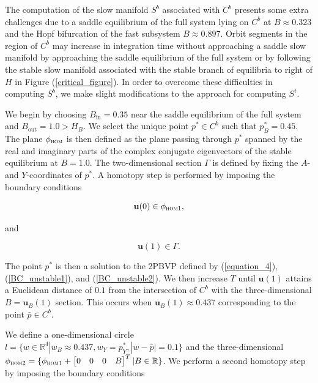 \documentclass{ws-ijbc}
\begin{document}
The computation of the slow manifold $S^b$ associated with $C^b$ presents some extra challenges due to a saddle equilibrium of the full system lying on $C^b$ at $B \approx 0.323$ and the Hopf bifurcation of the fast subsystem $B \approx 0.897$.  Orbit segments in the region of $C^b$ may increase in integration time without approaching a saddle slow manifold by approaching the saddle equilibrium of the full system or by following the stable slow manifold associated with the stable branch of equilibria to right of $H$ in Figure (\ref{critical_figure}).  In order to overcome these difficulties in computing $S^b$, we make slight modifications to the approach for computing $S^t$.

We begin by choosing $B_{\mathrm{in}} = 0.35$ near the saddle equilibrium of the full system and $B_{\mathrm{out}}=1.0 > H_B$.  We select the unique point $p^* \in C^b$ such that $p^*_B = 0.45$.  The plane $\phi_{\textsc{hom}}$ is then defined as the plane passing through $p^*$ spanned by the real and imaginary parts of the complex conjugate eigenvectors of the stable equilibrium at $B=1.0$.  The two-dimensional section $\Gamma$ is defined by fixing the $A$- and $Y$-coordinates of $p^*$.  A homotopy step is performed by imposing the boundary conditions

\begin{equation}
\mathbf{u}(0) \in \phi_{\textsc{hom1}},
\label{BC_unstable1}
\end{equation}

and

\begin{equation}
\mathbf{u}(1) \in \Gamma.
\label{BC_unstable2}
\end{equation}

\noindent
The point $p^*$ is then a solution to the 2PBVP defined by (\ref{equation_4}), (\ref{BC_unstable1}), and (\ref{BC_unstable2}).  We then increase $T$ until $\mathbf{u}(1)$ attains a Euclidean distance of $0.1$ from the intersection of $C^b$ with the three-dimensional $B = \mathbf{u}_B(1)$ section.  This occurs when $ \mathbf{u}_B(1) \approx 0.437$ corresponding to the point $\bar{p} \in C^b$.  

We define a one-dimensional circle $l = \{w \in \mathbb{R}^4 | w_B \approx 0.437, w_Y =p^*_Y, |w-\bar{p}| = 0.1\}$ and the three-dimensional $\phi_{\textsc{hom2}} = \{\phi_{\textsc{hom1}} + \begin{bmatrix} 0 & 0 & 0 & B \end{bmatrix}^{T}| B \in \mathbb{R} \}$.  We perform a second homotopy step by imposing the boundary conditions
\end{document}

